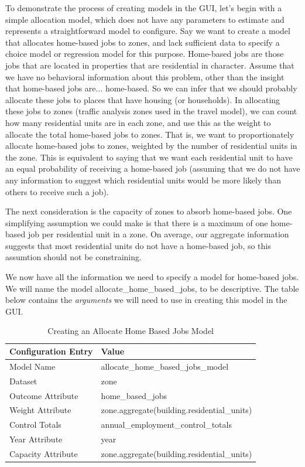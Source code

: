 To demonstrate the process of creating models in the GUI, let's begin with a simple allocation model, which does not have any parameters to estimate and represents a straightforward model to configure.  Say we want to create a model that allocates home-based jobs to zones, and lack sufficient data to specify a choice model or regression model for this purpose.  Home-based jobs are those jobs that are located in properties that are residential in character.  Assume that we have no behavioral information about this problem, other than the insight that home-based jobs are... home-based.  So we can infer that we should probably allocate these jobs to places that have housing (or households).  In allocating these jobs to zones (traffic analysis zones used in the travel model), we can count how many residential units are in each zone, and use this as the weight to allocate the total home-based jobs to zones.  That is, we want to proportionately allocate home-based jobs to zones, weighted by the number of residential units in the zone.  This is equivalent to saying that we want each residential unit to have an equal probability of receiving a home-based job (assuming that we do not have any information to suggest which residential units would be more likely than others to receive such a job).

The next consideration is the capacity of zones to absorb home-based jobs.  One simplifying assumption we could make is that there is a maximum of one home-based job per residential unit in a zone.  On average, our aggregate information suggests that most residential units do not have a home-based job, so this assumtion should not be constraining.

We now have all the information we need to specify a model for home-based jobs.  We will name the model allocate\_home\_based\_jobs, to be descriptive.  The table below contains the \emph{arguments} we will need to use in creating this model in the GUI.

\begin{table}[htp]
\caption{Creating an Allocate Home Based Jobs Model}
\label{tab:allocation-model}
\begin{center}
\begin{tabular}{ p{1.5in}  p{4.4in}  }
\toprule[1.5pt]
Configuration Entry & Value \\
\midrule
Model Name & allocate\_home\_based\_jobs\_model \\
Dataset & zone \\
Outcome Attribute & home\_based\_jobs \\
Weight Attribute & zone.aggregate(building.residential\_units) \\
Control Totals & annual\_employment\_control\_totals \\
Year Attribute & year \\
Capacity Attribute & zone.aggregate(building.residential\_units) \\
\bottomrule
\end{tabular}
\end{center}
\end{table}

